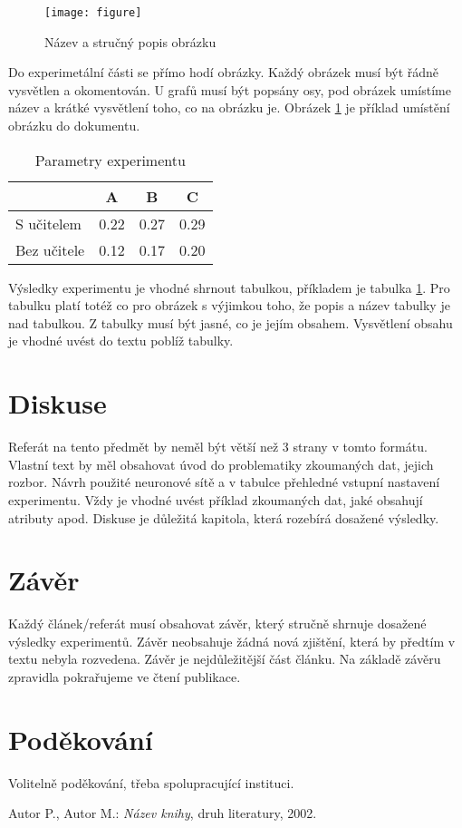 \documentclass[journal]{IEEEtrancz}
\begin{document}
\begin{figure}[ht]
  \centering
    \texttt{[image: figure]}
      \caption{Název a stručný popis obrázku}
    \label{fig:exfig}
\end{figure}

Do experimetální části se přímo hodí obrázky. Každý obrázek musí být řádně vysvětlen
a okomentován. U grafů musí být popsány osy, pod obrázek umístíme název a
krátké vysvětlení toho, co na obrázku je. Obrázek \ref{fig:exfig} je příklad
umístění obrázku do dokumentu.

\begin{table}
  \centering
  \caption{Parametry experimentu}
  \begin{tabular}{|l||c|c|c|}
  \hline
    & A & B & C \\
  \hline
  \hline
  S učitelem  & 0.22 & 0.27 & 0.29 \\
  \hline
  Bez učitele & 0.12 & 0.17 & 0.20 \\
  \hline
  \end{tabular}
  \label{tab:extab}
\end{table}

Výsledky experimentu je vhodné shrnout tabulkou, příkladem
je tabulka \ref{tab:extab}. Pro tabulku platí totéž co
pro obrázek s výjimkou toho, že popis a název tabulky je nad tabulkou. Z tabulky
musí být jasné, co je jejím obsahem. Vysvětlení obsahu je vhodné uvést
do textu poblíž tabulky.

\section{Diskuse}
Referát na tento předmět by neměl být větší než 3 strany v tomto formátu.
Vlastní text by měl obsahovat úvod do problematiky zkoumaných dat, jejich rozbor. Návrh
použité neuronové sítě a v tabulce přehledné vstupní nastavení experimentu. Vždy je vhodné
uvést příklad zkoumaných dat, jaké obsahují atributy apod. Diskuse je důležitá kapitola,
která rozebírá dosažené výsledky.

\section{Závěr}
Každý článek/referát musí obsahovat závěr, který stručně shrnuje dosažené výsledky
experimentů. Závěr neobsahuje žádná nová zjištění, která by předtím v textu nebyla rozvedena.
Závěr je nejdůležitější část článku. Na základě závěru zpravidla pokrařujeme ve čtení
publikace.

\section*{Poděkování}
Volitelně poděkování, třeba spolupracující instituci.

\begin{literatura}{1}

Autor P., Autor M.: \emph{Název knihy}, druh literatury, 2002.

\end{literatura}
\end{document}
